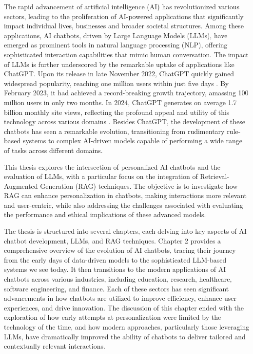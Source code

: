 The rapid advancement of artificial intelligence (AI) has revolutionized various sectors, leading to the proliferation of AI-powered applications that significantly impact individual lives, businesses and broader societal structures. Among these applications, AI chatbots, driven by Large Language Models (LLMs), have emerged as prominent tools in natural language processing (NLP), offering sophisticated interaction capabilities that mimic human conversation. The impact of LLMs is further underscored by the remarkable uptake of applications like ChatGPT. Upon its release in late November 2022, ChatGPT quickly gained widespread popularity, reaching one million users within just five days \cite{wu2023brief}. By February 2023, it had achieved a record-breaking growth trajectory, amassing 100 million users in only two months. In 2024, ChatGPT generates on average 1.7 billion monthly site views, reflecting the profound appeal and utility of this technology across various domains \cite{aiprm2023chatgpt}. Besides ChatGPT, the development of these chatbots has seen a remarkable evolution, transitioning from rudimentary rule-based systems to complex AI-driven models capable of performing a wide range of tasks across different domains.

This thesis explores the intersection of personalized AI chatbots and the evaluation of LLMs, with a particular focus on the integration of Retrieval-Augmented Generation (RAG) techniques. The objective is to investigate how RAG can enhance personalization in chatbots, making interactions more relevant and user-centric, while also addressing the challenges associated with evaluating the performance and ethical implications of these advanced models.

The thesis is structured into several chapters, each delving into key aspects of AI chatbot development, LLMs, and RAG techniques. Chapter 2 provides a comprehensive overview of the evolution of AI chatbots, tracing their journey from the early days of data-driven models to the sophisticated LLM-based systems we see today. It then transitions to the modern applications of AI chatbots across various industries, including education, research, healthcare, software engineering, and finance. Each of these sectors has seen significant advancements in how chatbots are utilized to improve efficiency, enhance user experiences, and drive innovation. The discussion of this chapter ended with the exploration of how early attempts at personalization were limited by the technology of the time, and how modern approaches, particularly those leveraging LLMs, have dramatically improved the ability of chatbots to deliver tailored and contextually relevant interactions.

